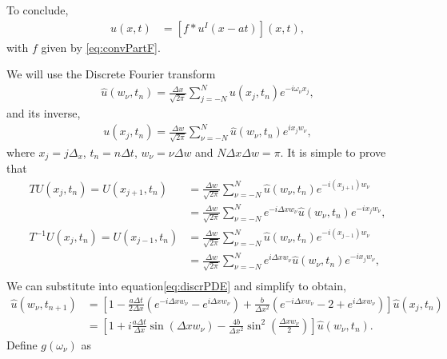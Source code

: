 \begin{questions}
\begin{solution}
To conclude,
\begin{align}
u(x,t)&=\left[f*u^I(x-at)\right](x,t),
\end{align}
with $f$ given by \eqref{eq:convPartF}.

\end{solution}
\newpage
{}
\begin{solution}
We will use the Discrete Fourier transform 
\begin{align}\label{eq:DiscrFourierTransf}
\hat{u}(w_{\nu},t_n)=\frac{\Delta x}{\sqrt{2\pi}}\sum_{j=-N}^N u(x_j,t_n)e^{-i\omega_{\nu} x_j},
\end{align}
and its inverse,
\begin{align}\label{eq:DiscrInvFourierTransf}
u(x_j,t_n)=\frac{\Delta w}{\sqrt{2\pi}}\sum_{\nu=-N}^N \hat{u}(w_{\nu},t_n)e^{ix_jw_{\nu}},
\end{align}
where $x_j = j\Delta_x$, $t_n=n\Delta t$, $w_{\nu}=\nu\Delta w$ and $N\Delta x\Delta w=\pi$. It is simple to prove that
\begin{align*}
TU(x_j,t_n)=U(x_{j+1},t_n)&=\frac{\Delta w}{\sqrt{2\pi}}\sum_{\nu=-N}^N \hat{u}(w_{\nu},t_n)e^{-i(x_{j+1})w_{\nu}}\\
&=\frac{\Delta w}{\sqrt{2\pi}}\sum_{\nu=-N}^N e^{-i\Delta xw_{\nu}}\hat{u}(w_{\nu},t_n)e^{-ix_jw_{\nu}},\\
T^{-1}U(x_j,t_n)=U(x_{j-1},t_n)&=\frac{\Delta w}{\sqrt{2\pi}}\sum_{\nu=-N}^N \hat{u}(w_{\nu},t_n)e^{-i(x_{j-1})w_{\nu}}\\
&=\frac{\Delta w}{\sqrt{2\pi}}\sum_{\nu=-N}^N e^{i\Delta xw_{\nu}}\hat{u}(w_{\nu},t_n)e^{-ix_jw_{\nu}},\\
\end{align*}
We can substitute into equation\eqref{eq:discrPDE} and simplify to obtain,
\begin{align}\label{eq:discrPDE}
\hat{u}(w_{\nu}, t_{n+1}) &= \left[1-\frac{a\Delta t}{ 2\Delta x}(e^{-i\Delta xw_{\nu}}-e^{i\Delta xw_{\nu}})+\frac{b}{\Delta x^2}(e^{-i\Delta xw_{\nu}}-2+e^{i\Delta xw_{\nu}})\right]\hat{u}(x_j, t_n)\nonumber\\
&= \left[1+i\frac{a\Delta t}{ \Delta x}\sin\left(\Delta xw_{\nu}\right)-\frac{4b}{\Delta x^2}\sin^2\left(\frac{\Delta xw_{\nu}}{2}\right)\right]\hat{u}(w_{\nu}, t_n).
\end{align}
Define $g(\omega_{\nu})$ as
\begin{align}

\end{align}
\end{solution}
\end{questions}
